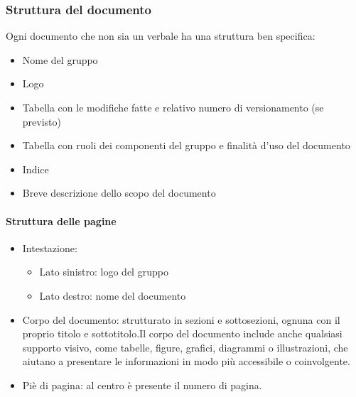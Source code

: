\documentclass[12pt]{article}
\begin{document}
\subsubsection{Struttura del documento}
Ogni documento che non sia un verbale ha una struttura ben specifica:
\begin{itemize}
    \item Nome del gruppo
    \item Logo
    \item Tabella con le modifiche fatte e relativo numero di versionamento (se previsto)
    \item Tabella con ruoli dei componenti del gruppo e finalità d'uso del documento
    \item Indice
    \item Breve descrizione dello scopo del documento
\end{itemize}

\paragraph{Struttura delle pagine}
\begin{itemize}
    \item Intestazione:
          \begin{itemize}
              \item Lato sinistro: logo del gruppo
              \item Lato destro: nome del documento
          \end{itemize}
    \item Corpo del documento:  strutturato in sezioni e sottosezioni, ognuna con il proprio titolo e sottotitolo.Il corpo del documento include anche qualsiasi supporto visivo, come tabelle, figure, grafici, 	diagrammi o illustrazioni, che aiutano a presentare le informazioni in modo più accessibile o coinvolgente.
    \item Piè di pagina: al centro è presente il numero di pagina.
\end{itemize}
\end{document}
